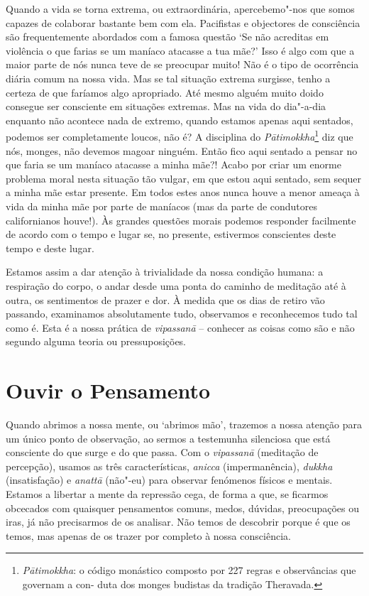 Quando a vida se torna extrema, ou extraordinária, apercebemo"-nos que
somos capazes de colaborar bastante bem com ela. Pacifistas e objectores
de consciência são frequentemente abordados com a famosa questão `Se
não acreditas em violência o que farias se um maníaco atacasse a tua
mãe?' Isso é algo com que a maior parte de nós nunca teve de se
preocupar muito! Não é o tipo de ocorrência diária comum na nossa vida.
Mas se tal situação extrema surgisse, tenho a certeza de que faríamos
algo apropriado. Até mesmo alguém muito doido consegue ser consciente em
situações extremas. Mas na vida do dia"-a-dia enquanto não acontece nada
de extremo, quando estamos apenas aqui sentados, podemos ser
completamente loucos, não é? A disciplina do \emph{Pātimokkha}\footnote{%
  \emph{Pātimokkha}: o código monástico composto por 227 regras e observâncias
  que governam a con- duta dos monges budistas da tradição Theravada.}
diz que nós, monges, não devemos magoar ninguém. Então fico aqui sentado a
pensar no que faria se um maníaco atacasse a minha mãe?! Acabo por criar
um enorme problema moral nesta
situação tão vulgar, em que estou aqui sentado, sem sequer a minha mãe
estar presente. Em todos estes anos nunca houve a menor ameaça à vida da
minha mãe por parte de maníacos (mas da parte de condutores
californianos houve!). Às grandes questões morais podemos responder
facilmente de acordo com o tempo e lugar se, no presente, estivermos
conscientes deste tempo e deste lugar.

Estamos assim a dar atenção à trivialidade da nossa condição humana: a
respiração do corpo, o andar desde uma ponta do caminho de meditação até
à outra, os sentimentos de prazer e dor. À medida que os dias de retiro
vão passando, examinamos absolutamente tudo, observamos e reconhecemos
tudo tal como é. Esta é a nossa prática de \emph{vipassanā} -- conhecer
as coisas como são e não segundo alguma teoria ou pressuposições.

\chapter{Ouvir o Pensamento}

Quando abrimos a nossa mente, ou `abrimos mão', trazemos a nossa atenção
para um único ponto de observação, ao sermos a testemunha silenciosa que
está consciente do que surge e do que passa. Com o \emph{vipassanā}
(meditação de percepção), usamos as três características, \emph{anicca}
(impermanência), \emph{dukkha} (insatisfação) e \emph{anattā} (não"-eu)
para observar fenómenos físicos e mentais. Estamos a libertar a mente da
repressão cega, de forma a que, se ficarmos obcecados com quaisquer
pensamentos comuns, medos, dúvidas, preocupações ou iras, já não
precisarmos de os analisar. Não temos de descobrir porque é que os
temos, mas apenas de os trazer por completo à nossa consciência.

